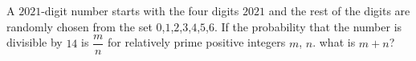 A $2021$-digit number starts with the four digits $2021$ and the rest of the digits are randomly chosen from the set $0$,$1$,$2$,$3$,$4$,$5$,$6$. If the probability that the number is divisible by $14$ is $\dfrac{m}{n}$ for relatively prime positive integers $m$, $n$. what is $m + n$?
